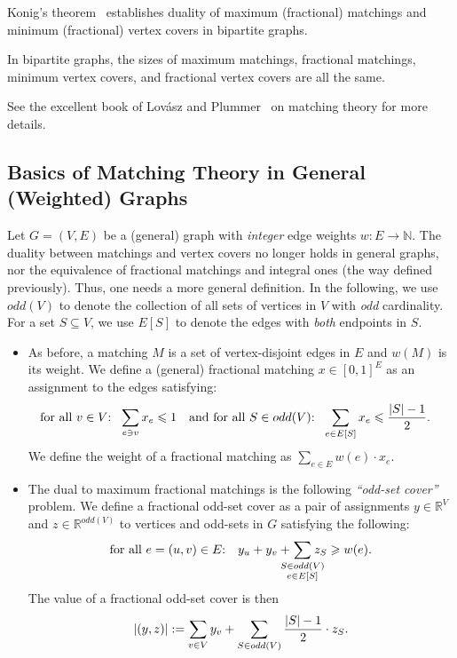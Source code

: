 \documentclass{theoretics}
\renewcommand{\leq}{\leqslant}
\renewcommand{\geq}{\geqslant}
\DeclarePairedDelimiter{\card}{\vert}{\vert}
\newcommand{\IR}{\mathbb{R}}
\newcommand{\IN}{\mathbb{N}}
\begin{document}
Konig's theorem~\cite{Konig1931} establishes duality of maximum (fractional) matchings and minimum (fractional) vertex covers  in bipartite graphs. 
\begin{fact}\label{fact:konig}
In bipartite graphs, the sizes of maximum matchings, fractional matchings, minimum vertex covers, and fractional vertex covers are all the same. 
\end{fact}

See the excellent book of Lov\'asz and Plummer~\cite{LovaszP09} on matching theory for more details. 

\subsection{Basics of Matching Theory in General (Weighted) Graphs}\label{sec:basics-general}

Let $G=(V,E)$ be a (general) graph with \emph{integer} edge weights $w: E \rightarrow \IN$. The duality between matchings and vertex covers no longer holds in general graphs, nor 
the equivalence of fractional matchings and integral ones (the way defined previously). Thus, one needs a more general definition. In the following, we use $odd(V)$ to denote
the collection of all sets of vertices in $V$ with \emph{odd} cardinality. For a set $S \subseteq V$, we use $E[S]$ to denote the edges with \emph{both} endpoints in $S$. 

\begin{itemize}
\item As before, a matching $M$ is a set of vertex-disjoint edges in $E$ and $w(M)$ is its weight. We define a (general) fractional matching $x \in [0,1]^E$ as an assignment to the edges satisfying: 
\begin{alignat*}{2}
	&\text{for all $v \in V$:} ~~\sum_{e \ni v} x_e \leq 1 \quad \text{and for all $S \in odd(V)$:} ~~ \sum_{e \in E[S]} x_e \leq \frac{\card{S}-1}{2}. 
\end{alignat*}
We define the weight of a fractional matching as $\sum_{e \in E} w(e) \cdot x_e$. 

\item The dual to maximum fractional matchings is the following \emph{``odd-set cover''} problem. We define a fractional odd-set cover as a pair of assignments $y \in \IR^V$ and $z \in \IR^{odd(V)}$ to vertices and odd-sets in $G$ 
satisfying the following: 
\begin{align}
	\text{for all $e=(u,v) \in E$:} \quad y_u + y_v + \hspace{-10pt}\sum_{\substack{S \in odd(V) \\ e \in E[S]}} \hspace{-10pt} z_S \geq w(e). \label{eq:fractional-odd-set-cover}
\end{align}
The value of a fractional odd-set cover is then
\[
	\card{(y,z)} := \sum_{v \in V} y_v + \sum_{S \in odd(V)} \frac{\card{S}-1}{2} \cdot z_S. 
\]
\end{itemize}
\end{document}
